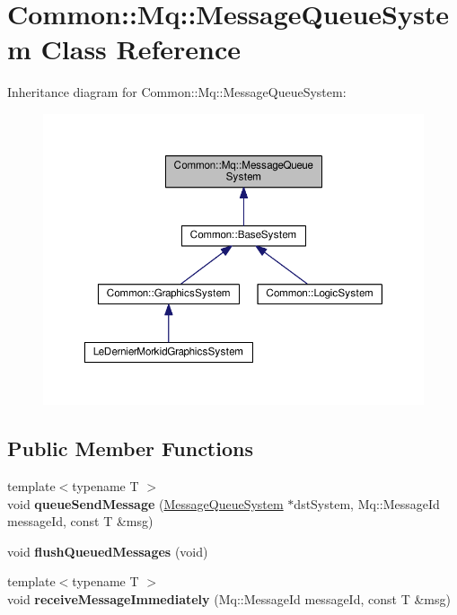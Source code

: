\hypertarget{class_common_1_1_mq_1_1_message_queue_system}{}\section{Common\+:\+:Mq\+:\+:Message\+Queue\+System Class Reference}
\label{class_common_1_1_mq_1_1_message_queue_system}


Inheritance diagram for Common\+:\+:Mq\+:\+:Message\+Queue\+System\+:\nopagebreak
\begin{figure}[H]
\begin{center}
\leavevmode
\includegraphics[width=350pt]{class_common_1_1_mq_1_1_message_queue_system__inherit__graph}
\end{center}
\end{figure}
\subsection*{Public Member Functions}
\begin{DoxyCompactItemize}
\item 
\mbox{\label{class_common_1_1_mq_1_1_message_queue_system_ab9a6196ad22221175ec636ea2b08ec5d}} 
{\footnotesize template$<$typename T $>$ }\\void {\bfseries queue\+Send\+Message} (\hyperlink{class_common_1_1_mq_1_1_message_queue_system}{Message\+Queue\+System} $\ast$dst\+System, Mq\+::\+Message\+Id message\+Id, const T \&msg)
\item 
\mbox{\label{class_common_1_1_mq_1_1_message_queue_system_a6294a354a094e6ae8fc53e6b936d1963}} 
void {\bfseries flush\+Queued\+Messages} (void)
\item 
\mbox{\label{class_common_1_1_mq_1_1_message_queue_system_a82f4a342971fc840169465d29b78b02f}} 
{\footnotesize template$<$typename T $>$ }\\void {\bfseries receive\+Message\+Immediately} (Mq\+::\+Message\+Id message\+Id, const T \&msg)
\end{DoxyCompactItemize}
